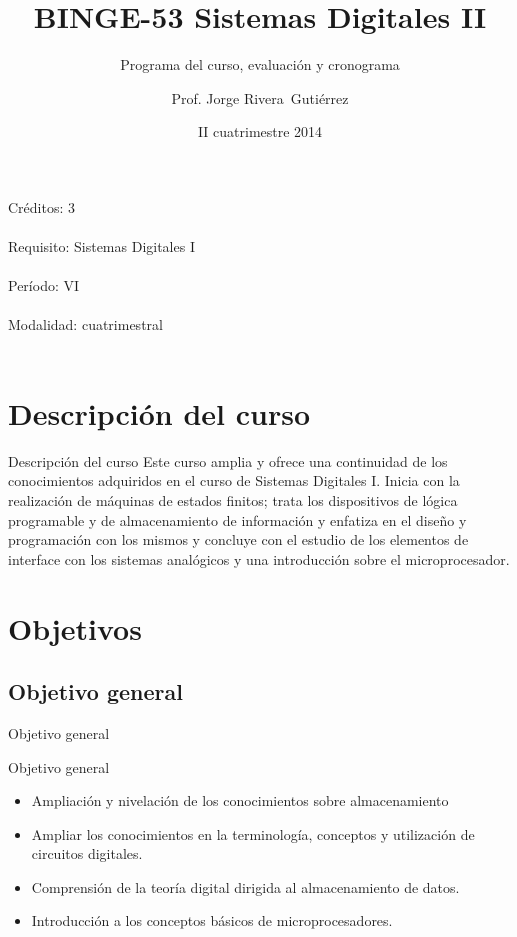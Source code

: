 \documentclass[handout,xcolor=dvipsnames]{beamer}
\title[BINGE-53]{BINGE-53 Sistemas Digitales II}
\subtitle{Programa del curso, evaluación y cronograma}
\author{Prof. Jorge Rivera~Guti\'errez}
\institute{Universidad Latina de Costa Rica\\ Ingenier\'\i a en Electr\'onica}
\date{II cuatrimestre 2014}
\newcommand{\pageframe}[1]{\frame{\begin{center}{ \Huge #1 }\end{center}}}
\begin{document}
\begin{frame}
 \maketitle
\end{frame}

\begin{frame}
 \begin{center}
  \Large Créditos: 3\\~\\
  Requisito: Sistemas Digitales I\\~\\
  Período: VI\\~\\
  Modalidad: cuatrimestral\\~\\
 \end{center}
\end{frame}

\section{Descripción del curso}

\begin{frame}{Descripción del curso}
Este curso amplia y ofrece una continuidad de los conocimientos adquiridos en el
curso de Sistemas Digitales I. Inicia con la realización de máquinas de estados
finitos; trata los dispositivos de lógica programable y de almacenamiento de
información y enfatiza en el diseño y programación con los mismos y concluye con
el estudio de los elementos de interface con los sistemas analógicos y una
introducción sobre el microprocesador.
\end{frame}

\section{Objetivos}

\pageframe{Objetivos}

\subsection{Objetivo general}

\begin{frame}{Objetivo general}
  \begin{block}{Objetivo general}
  \begin{itemize}
	\item   Ampliación y nivelación de los conocimientos sobre almacenamiento
  
	\item  Ampliar los conocimientos en la terminología, conceptos y utilización de circuitos digitales.
  
	\item Comprensión de la teoría digital dirigida al almacenamiento de datos.
  
	\item  Introducción a los conceptos básicos de microprocesadores.
  \end{itemize}
  \end{block}
\end{frame}
\end{document}
